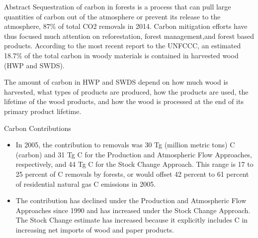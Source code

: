 \documentclass[final]{beamer}\usepackage[]{graphicx}\usepackage[]{color}
\newlength{\onecolwid}
\begin{document}
\begin{frame}[t]
\begin{columns}[t]
\begin{column}{\onecolwid} %


\begin{alertblock}{Abstract}
Sequestration of carbon in forests is a process that can pull large quantities of carbon out of the atmosphere or prevent its release to the atmosphere, 87\% of total CO2 removals in 2014. Carbon mitigation efforts have thus focused much attention on reforestation, forest management,and forest based products. According to the most recent report to the UNFCCC, an estimated 18.7\% of the total carbon in woody materials is contained in harvested wood (HWP and SWDS).  


The amount of carbon in HWP and SWDS depend on how much wood is harvested, what types of products are produced, how the products are used, the lifetime of the wood products, and how the wood is processed at the end of its primary product lifetime.

\end{alertblock}


\begin{block}{Carbon Contributions}
\begin{itemize}
\item In 2005, the contribution to removals was 30 Tg (million metric tons) C (carbon) and 31 Tg C for the Production and Atmospheric Flow Approaches, respectively, and 44 Tg C for the Stock Change Approach. This range is 17 to 25 percent of C removals by forests, or would offset 42 percent to 61 percent of residential natural gas C emissions in 2005. 
\vspace{1ex}
\item The contribution has declined under the Production and Atmospheric Flow Approaches since 1990 and has increased under the Stock Change Approach. The Stock Change estimate has increased because it explicitly includes C in increasing net imports of wood and paper products. 
\vspace{1ex}
\end{itemize}
\vspace{0ex}
\vfill
\end{block}


\end{column}
\end{columns}
\end{frame}
\end{document}

